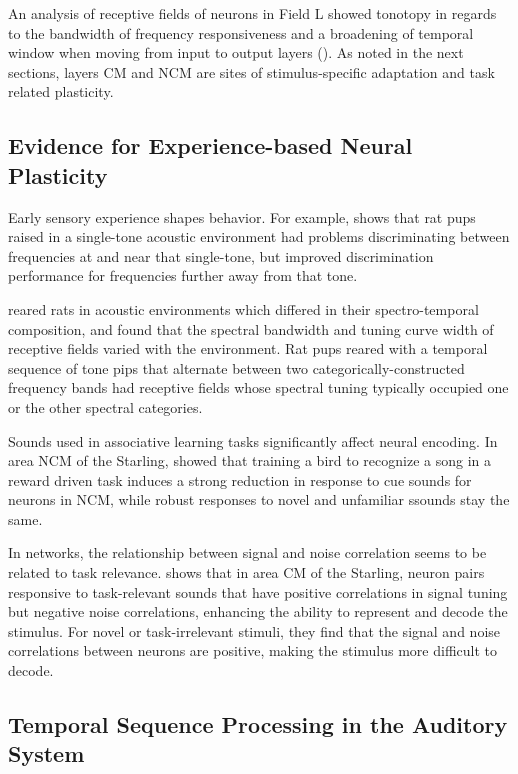 \documentclass[12pt,article,oneside]{memoir}
\begin{document}
An analysis of receptive fields of neurons in Field L showed tonotopy in regards to
the bandwidth of frequency responsiveness and a broadening of temporal window when
moving from input to output layers (\cite{Kim2011a}). As noted in the next sections,
layers CM and NCM are sites of stimulus-specific adaptation and task related
plasticity.


\subsection{Evidence for Experience-based Neural Plasticity}

Early sensory experience shapes behavior. For example, \cite{Han2007} shows that rat
pups raised in a single-tone acoustic environment had problems discriminating between
frequencies at and near that single-tone, but improved discrimination performance for
frequencies further away from that tone.

\cite{Kover2013} reared rats in acoustic environments
which differed in their spectro-temporal composition, and found that the spectral bandwidth
and tuning curve width of receptive fields varied with the environment. Rat pups reared
with a temporal sequence of tone pips that alternate between two categorically-constructed frequency
bands had receptive fields whose spectral tuning typically occupied one or the other
spectral categories.

Sounds used in associative learning tasks significantly affect neural encoding. In area NCM of
the Starling, \cite{Thompson2010} showed that training a bird to recognize a song in a
reward driven task induces a strong reduction in response to cue sounds for neurons in NCM,
while robust responses to novel and unfamiliar ssounds stay the same.

In networks, the relationship between signal
and noise correlation seems to be related to task relevance. \cite{Jeanne2013} shows that in
area CM of the Starling, neuron pairs responsive to task-relevant sounds that have positive
correlations in signal tuning but negative noise correlations, enhancing the ability
to represent and decode the stimulus. For novel or task-irrelevant stimuli, they find that the signal
and noise correlations between neurons are positive, making the stimulus more difficult
to decode.


\subsection{Temporal Sequence Processing in the Auditory System}
\end{document}

